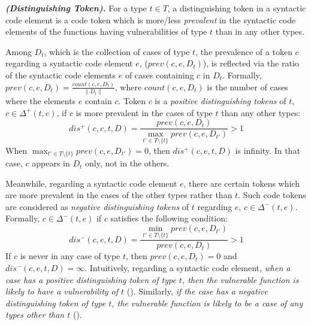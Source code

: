 \begin{definition}{\textit{\textbf{(Distinguishing Token).}}}
For a type $t \in T$, a distinguishing token in a syntactic code element is a code token which is more/less \textit{prevalent} in the syntactic code elements of the functions having vulnerabilities of type $t$ than in any other types.
\end{definition}
%
Among $D_t$, which is the collection of cases of type $t$, the prevalence of a token $c$ regarding a syntactic code element $e$, ($prev(c, e, D_t)$), is reflected via the ratio of the syntactic code elements $e$ of cases containing $c$ in $D_t$. Formally, $prev(c, e, D_t) = \frac{count(c, e, D_t)}{\|D_t\|}$, where $count(c, e, D_t)$ is the number of cases where the elements $e$ contain $c$. Token $c$ is a \textit{positive distinguishing tokens} of $t$, $c \in \Delta^+(t, e)$, if $c$ is more prevalent in the cases of type $t$ than any other types: 
%
$$
dis^+(c, e, t, D) = \frac{prev(c, e, D_t)}{\max_{t' \in T \setminus \{t\}} prev(c, e, D_{t'})} > 1
$$
%
%
When $\max_{t' \in T \setminus \{t\}} prev(c, e, D_{t'}) = 0$, then $dis^+(c, e, t, D)$ is infinity. In that case, $c$ appears in $D_t$ only, not in the others.
%
%

Meanwhile, regarding a syntactic code element $e$, there are certain tokens which are more prevalent in the cases of the other types rather than $t$. Such code tokens are considered as \textit{negative distinguishing tokens} of $t$ regarding $e$, $c \in \Delta^-(t, e)$. Formally, $c \in \Delta^-(t, e)$ if $c$ satisfies the following condition:
%
$$
dis^-(c, e, t, D) = \frac{\min_{t' \in T \setminus \{t\}} prev(c, e, D_{t'})}{prev(c, e, D_t)} > 1
$$
%
%
%
%
If $c$ is never in any case of type $t$, then $prev(c, e, D_t) = 0$ and $dis^-(c, e, t, D) = \infty$.
%
Intuitively, regarding a syntactic code element, \textit{when a case has a positive distinguishing token of type $t$, then the vulnerable function is likely to have a vulnerability of $t$} (\rp). Similarly, \textit{if the case has a negative distinguishing token of type $t$, the vulnerable function is likely to be a case of any types other than $t$} (\rn).


